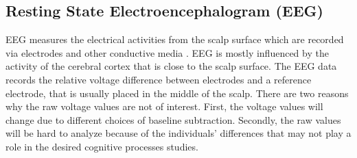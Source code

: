 \documentclass[a4paper,11pt,oneside]{article}
\begin{document}
\subsection{Resting State Electroencephalogram (EEG)}
EEG measures the electrical activities from the scalp surface which are recorded via electrodes and other conductive media \cite{niedermeyer2005electroencephalography}. EEG is mostly influenced by the activity of the cerebral cortex that is close to the scalp surface. The EEG data records the relative voltage difference between electrodes and a reference electrode, that is usually placed in the middle of the scalp. There are two reasons why the raw voltage values are not of interest. First, the voltage values will change due to different choices of baseline subtraction. Secondly, the raw values will be hard to analyze because of the individuals' differences that may not play a role in the desired cognitive processes studies. \cite{cohen2014analyzing}
\end{document}
